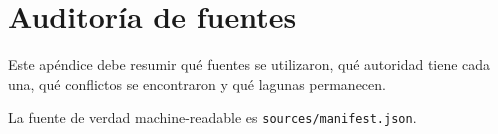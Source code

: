\chapter{Auditoría de fuentes}

Este apéndice debe resumir qué fuentes se utilizaron, qué autoridad tiene cada una, qué conflictos se encontraron y qué lagunas permanecen.

La fuente de verdad machine-readable es \texttt{sources/manifest.json}.
